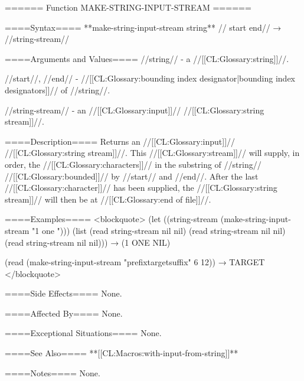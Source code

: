 ====== Function MAKE-STRING-INPUT-STREAM ======

====Syntax====
**make-string-input-stream {string** //\opt} start end// → //string-stream//

====Arguments and Values====
//string// - a //[[CL:Glossary:string]]//.

//start//, //end// - //[[CL:Glossary:bounding index designator|bounding index designators]]// of //string//. 

//string-stream// - an //[[CL:Glossary:input]]// //[[CL:Glossary:string stream]]//.

====Description====
Returns an //[[CL:Glossary:input]]// //[[CL:Glossary:string stream]]//. This //[[CL:Glossary:stream]]// will supply, in order, the //[[CL:Glossary:characters]]// in the substring of //string// //[[CL:Glossary:bounded]]// by //start// and //end//. After the last //[[CL:Glossary:character]]// has been supplied, the //[[CL:Glossary:string stream]]// will then be at //[[CL:Glossary:end of file]]//.

====Examples====
<blockquote> (let ((string-stream (make-string-input-stream "1 one "))) (list (read string-stream nil nil) (read string-stream nil nil) (read string-stream nil nil))) → (1 ONE NIL)

(read (make-string-input-stream "prefixtargetsuffix" 6 12)) → TARGET </blockquote>

====Side Effects====
None.

====Affected By====
None.

====Exceptional Situations====
None.

====See Also====
**[[CL:Macros:with-input-from-string]]**

====Notes====
None.

 
